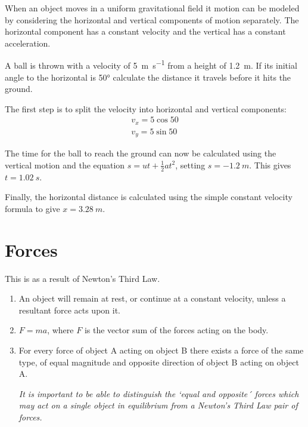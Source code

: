 \documentclass[main.tex]{subfiles}
\begin{document}
When an object moves in a uniform gravitational field it motion can be modeled by considering the horizontal and vertical components of motion separately. The horizontal component has a constant velocity and the vertical has a constant acceleration.

\begin{example}
A ball is thrown with a velocity of \SI{5}{m.s^{-1}} from a height of \SI{1.2}{m}. If its initial angle to the horizontal is \ang{50} calculate the distance it travels before it hits the ground.
\answer

The first step is to split the velocity into horizontal and vertical components:
	\begin{align*}
		v_x = 5\cos{50}\\
		v_y = 5\sin{50}
	\end{align*}

	The time for the ball to reach the ground can now be calculated using the vertical motion and the equation $s=ut+\frac{1}{2}at^2$, setting $s = \SI{-1.2}{m}$. This gives $t=\SI{1.02}{s}$.

	Finally, the horizontal distance is calculated using the simple constant velocity formula to give $x=\SI{3.28}{m}$.
\end{example}

\section{Forces}


This is as a result of Newton's Third Law.

\begin{enumerate}
	\item An object will remain at rest, or continue at a constant velocity, unless a resultant force acts upon it.
	\item $F=ma$, where $F$ is the vector sum of the forces acting on the body.
	\item For every force of object A acting on object B there exists a force of the same type, of equal magnitude and opposite direction of object B acting on object A.

	\emph{It is important to be able to distinguish the `equal and opposite´ forces which may act on a single object in equilibrium from a Newton's Third Law pair of forces.}
\end{enumerate}
\end{document}
